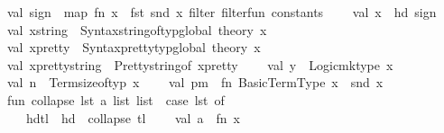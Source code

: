 \begin{isabellebody}
\ \ \ \ val\ sign\ {\isacharequal}{\kern0pt}\ map\ {\isacharparenleft}{\kern0pt}fn\ x\ {\isacharequal}{\kern0pt}{\isachargreater}{\kern0pt}\ {\isacharparenleft}{\kern0pt}fst\ {\isacharparenleft}{\kern0pt}snd\ x{\isacharparenright}{\kern0pt}{\isacharparenright}{\kern0pt}{\isacharparenright}{\kern0pt}\ {\isacharparenleft}{\kern0pt}filter\ filter{\isacharunderscore}{\kern0pt}fun{}\ constants{\isacharparenright}{\kern0pt}\isanewline
\isanewline
\isanewline
\isanewline
\ \ \ \ val\ x\ {\isacharequal}{\kern0pt}\ hd\ sign\isanewline
\isanewline
\ \ \ \ val\ x{\isacharunderscore}{\kern0pt}string\ {\isacharequal}{\kern0pt}\ Syntax{\isachardot}{\kern0pt}string{\isacharunderscore}{\kern0pt}of{\isacharunderscore}{\kern0pt}typ{\isacharunderscore}{\kern0pt}global\ {\isacharat}{\kern0pt}{\isacharbraceleft}{\kern0pt}theory{\isacharbraceright}{\kern0pt}\ x\isanewline
\isanewline
\ \ \ \ val\ x{\isacharunderscore}{\kern0pt}pretty\ {\isacharequal}{\kern0pt}\ Syntax{\isachardot}{\kern0pt}pretty{\isacharunderscore}{\kern0pt}typ{\isacharunderscore}{\kern0pt}global\ {\isacharat}{\kern0pt}{\isacharbraceleft}{\kern0pt}theory{\isacharbraceright}{\kern0pt}\ x\isanewline
\isanewline
\ \ \ \ val\ x{\isacharunderscore}{\kern0pt}pretty{\isacharunderscore}{\kern0pt}string\ {\isacharequal}{\kern0pt}\ Pretty{\isachardot}{\kern0pt}string{\isacharunderscore}{\kern0pt}of\ x{\isacharunderscore}{\kern0pt}pretty\isanewline
\isanewline
\ \ \ \ val\ y\ {\isacharequal}{\kern0pt}\ Logic{\isachardot}{\kern0pt}mk{\isacharunderscore}{\kern0pt}type\ x\isanewline
\isanewline
\ \ \ \ val\ n\ {\isacharequal}{\kern0pt}\ Term{\isachardot}{\kern0pt}size{\isacharunderscore}{\kern0pt}of{\isacharunderscore}{\kern0pt}typ\ x\isanewline
\isanewline
\ \ \ \ val\ pm\ {\isacharequal}{\kern0pt}\ fn\ Basic{\isacharunderscore}{\kern0pt}Term{\isachardot}{\kern0pt}Type\ x\ {\isacharequal}{\kern0pt}{\isachargreater}{\kern0pt}\ snd\ x\isanewline
\isanewline
\ \ \ \ fun\ collapse\ {\isacharparenleft}{\kern0pt}lst{\isacharcolon}{\kern0pt}\ {\isacharprime}{\kern0pt}a\ list\ list{\isacharparenright}{\kern0pt}\ {\isacharequal}{\kern0pt}\ case\ lst\ of\isanewline
\ \ \ \ \ \ \ \ {\isacharbrackleft}{\kern0pt}{\isacharbrackright}{\kern0pt}\ {\isacharequal}{\kern0pt}{\isachargreater}{\kern0pt}\ {\isacharbrackleft}{\kern0pt}{\isacharbrackright}{\kern0pt}\isanewline
\ \ \ \ \ \ {\isacharbar}{\kern0pt}\ hd{\isacharcolon}{\kern0pt}{\isacharcolon}{\kern0pt}tl\ {\isacharequal}{\kern0pt}{\isachargreater}{\kern0pt}\ hd\ {\isacharat}{\kern0pt}\ collapse\ tl\isanewline
\isanewline
\ \ \ \ val\ a\ {\isacharequal}{\kern0pt}\ fn\ x\ {\isacharequal}{\kern0pt}{\isachargreater}{\kern0pt}\isanewline

\end{isabellebody}
